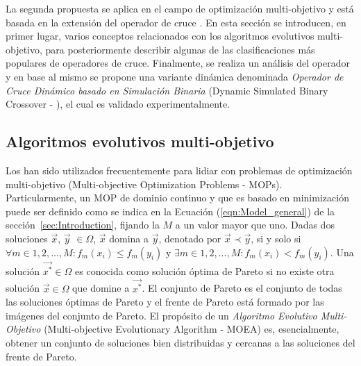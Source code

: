 La segunda propuesta se aplica en el campo de optimización multi-objetivo y está basada en la extensión del operador de
cruce \SBX{}.
%
En esta sección se introducen, en primer lugar, varios conceptos relacionados con los algoritmos evolutivos multi-objetivo, 
para posteriormente describir algunas de las clasificaciones más populares de operadores de cruce.
%
Finalmente, se realiza un análisis del operador \SBX{} y en base al mismo se propone una variante dinámica denominada 
\textit{Operador de Cruce Dinámico basado en Simulación Binaria} (Dynamic Simulated Binary Crossover - \DSBX{}), el cual
es validado experimentalmente.

\subsection{Algoritmos evolutivos multi-objetivo}

Los \EAS{} han sido utilizados frecuentemente para lidiar con problemas de optimización multi-objetivo (Multi-objective Optimization Problems - MOPs).
%
Particularmente, un MOP de dominio continuo y que es basado en minimización puede ser definido como se indica en la Ecuación (\ref{eqn:Model_general}) de la sección~\ref{sec:Introduction}, fijando la $M$
a un valor mayor que uno.
%
Dadas dos soluciones $\vec{x}$, $\vec{y}$ $\in \Omega$, $\vec{x}$ domina a $\vec{y}$, denotado por $\vec{x} \prec \vec{y}$, 
si y solo si $\forall m \in {1,2,...,M} : f_m(x_i) \leq f_m(y_i)$ y $\exists m \in {1,2,...,M} : f_m(x_i) < f_m(y_i)$.
%
Una solución $\vec{x^*} \in \Omega$ es conocida como solución óptima de Pareto si no existe otra solución $\vec{x} \in \Omega$ que domine a $\vec{x^*}$.
%
El conjunto de Pareto es el conjunto de todas las soluciones óptimas de Pareto y el frente de Pareto está formado por las imágenes del conjunto de Pareto.
%
El propósito de un \textit{Algoritmo Evolutivo Multi-Objetivo} (Multi-objective Evolutionary Algorithm - MOEA) es, esencialmente, obtener 
un conjunto de soluciones bien distribuidas y cercanas a las soluciones del frente de Pareto.

